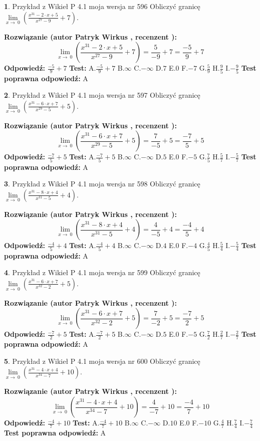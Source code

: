 \documentclass[12pt, a4paper]{article}
\theoremstyle{definition} %
\newtheorem{zad}{}
\newcommand{\zadStart}[1]{\begin{zad}#1\newline}
\newcommand{\zadStop}{\end{zad}}
\newcommand{\rozwStart}[2]{\noindent \textbf{Rozwiązanie (autor #1 , recenzent #2): }\newline}
\newcommand{\rozwStop}{\newline}
\newcommand{\odpStart}{\noindent \textbf{Odpowiedź:}\newline}
\newcommand{\odpStop}{\newline}
\newcommand{\testStart}{\noindent \textbf{Test:}\newline}
\newcommand{\testStop}{\newline}
\newcommand{\kluczStart}{\noindent \textbf{Test poprawna odpowiedź:}\newline}
\newcommand{\kluczStop}{\newline}
\begin{document}
\zadStart{Przykład z Wikieł P 4.1 moja wersja nr 596}
Obliczyć granicę $\lim\limits_{x\to\ 0}(\frac{x^{31}-2 \cdot x +5}{x^{27}-9}+7)$.
\zadStop
\rozwStart{Patryk Wirkus}{}
$$\lim\limits_{x\to\ 0}(\frac{x^{31}-2 \cdot x +5}{x^{27}-9}+7)=\frac{5}{-9}+7=\frac{-5}{9}+7$$
\rozwStop
\odpStart
$\frac{-5}{9}+7$
\odpStop
\testStart
A.$\frac{-5}{9}+7$
B.$\infty$
C.$-\infty$
D.$7$
E.$0$
F.$-7$
G.$\frac{5}{9}$
H.$\frac{9}{5}$
I.$-\frac{9}{5}$
\testStop
\kluczStart
A
\kluczStop



\zadStart{Przykład z Wikieł P 4.1 moja wersja nr 597}
Obliczyć granicę $\lim\limits_{x\to\ 0}(\frac{x^{31}-6 \cdot x +7}{x^{29}-5}+5)$.
\zadStop
\rozwStart{Patryk Wirkus}{}
$$\lim\limits_{x\to\ 0}(\frac{x^{31}-6 \cdot x +7}{x^{29}-5}+5)=\frac{7}{-5}+5=\frac{-7}{5}+5$$
\rozwStop
\odpStart
$\frac{-7}{5}+5$
\odpStop
\testStart
A.$\frac{-7}{5}+5$
B.$\infty$
C.$-\infty$
D.$5$
E.$0$
F.$-5$
G.$\frac{7}{5}$
H.$\frac{5}{7}$
I.$-\frac{5}{7}$
\testStop
\kluczStart
A
\kluczStop



\zadStart{Przykład z Wikieł P 4.1 moja wersja nr 598}
Obliczyć granicę $\lim\limits_{x\to\ 0}(\frac{x^{31}-8 \cdot x +4}{x^{31}-5}+4)$.
\zadStop
\rozwStart{Patryk Wirkus}{}
$$\lim\limits_{x\to\ 0}(\frac{x^{31}-8 \cdot x +4}{x^{31}-5}+4)=\frac{4}{-5}+4=\frac{-4}{5}+4$$
\rozwStop
\odpStart
$\frac{-4}{5}+4$
\odpStop
\testStart
A.$\frac{-4}{5}+4$
B.$\infty$
C.$-\infty$
D.$4$
E.$0$
F.$-4$
G.$\frac{4}{5}$
H.$\frac{5}{4}$
I.$-\frac{5}{4}$
\testStop
\kluczStart
A
\kluczStop



\zadStart{Przykład z Wikieł P 4.1 moja wersja nr 599}
Obliczyć granicę $\lim\limits_{x\to\ 0}(\frac{x^{31}-6 \cdot x +7}{x^{32}-2}+5)$.
\zadStop
\rozwStart{Patryk Wirkus}{}
$$\lim\limits_{x\to\ 0}(\frac{x^{31}-6 \cdot x +7}{x^{32}-2}+5)=\frac{7}{-2}+5=\frac{-7}{2}+5$$
\rozwStop
\odpStart
$\frac{-7}{2}+5$
\odpStop
\testStart
A.$\frac{-7}{2}+5$
B.$\infty$
C.$-\infty$
D.$5$
E.$0$
F.$-5$
G.$\frac{7}{2}$
H.$\frac{2}{7}$
I.$-\frac{2}{7}$
\testStop
\kluczStart
A
\kluczStop



\zadStart{Przykład z Wikieł P 4.1 moja wersja nr 600}
Obliczyć granicę $\lim\limits_{x\to\ 0}(\frac{x^{31}-4 \cdot x +4}{x^{34}-7}+10)$.
\zadStop
\rozwStart{Patryk Wirkus}{}
$$\lim\limits_{x\to\ 0}(\frac{x^{31}-4 \cdot x +4}{x^{34}-7}+10)=\frac{4}{-7}+10=\frac{-4}{7}+10$$
\rozwStop
\odpStart
$\frac{-4}{7}+10$
\odpStop
\testStart
A.$\frac{-4}{7}+10$
B.$\infty$
C.$-\infty$
D.$10$
E.$0$
F.$-10$
G.$\frac{4}{7}$
H.$\frac{7}{4}$
I.$-\frac{7}{4}$
\testStop
\kluczStart
A
\kluczStop
\end{document}

